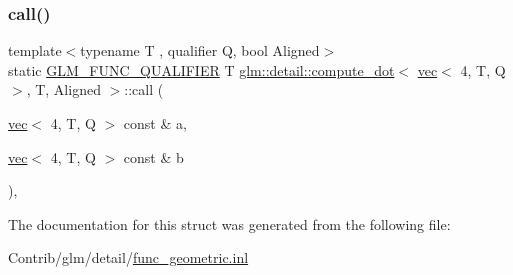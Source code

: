 \subsubsection{\texorpdfstring{call()}{call()}}
{\footnotesize\ttfamily template$<$typename T , qualifier Q, bool Aligned$>$ \\
static \mbox{\hyperlink{setup_8hpp_a33fdea6f91c5f834105f7415e2a64407}{G\+L\+M\+\_\+\+F\+U\+N\+C\+\_\+\+Q\+U\+A\+L\+I\+F\+I\+ER}} T \mbox{\hyperlink{structglm_1_1detail_1_1compute__dot}{glm\+::detail\+::compute\+\_\+dot}}$<$ \mbox{\hyperlink{structglm_1_1vec}{vec}}$<$ 4, T, Q $>$, T, Aligned $>$\+::call (\begin{DoxyParamCaption}\item[{\mbox{\hyperlink{structglm_1_1vec}{vec}}$<$ 4, T, Q $>$ const \&}]{a,  }\item[{\mbox{\hyperlink{structglm_1_1vec}{vec}}$<$ 4, T, Q $>$ const \&}]{b }\end{DoxyParamCaption})\hspace{0.3cm}{\ttfamily [inline]}, {\ttfamily [static]}}



The documentation for this struct was generated from the following file\+:\begin{DoxyCompactItemize}
\item 
Contrib/glm/detail/\mbox{\hyperlink{func__geometric_8inl}{func\+\_\+geometric.\+inl}}\end{DoxyCompactItemize}
